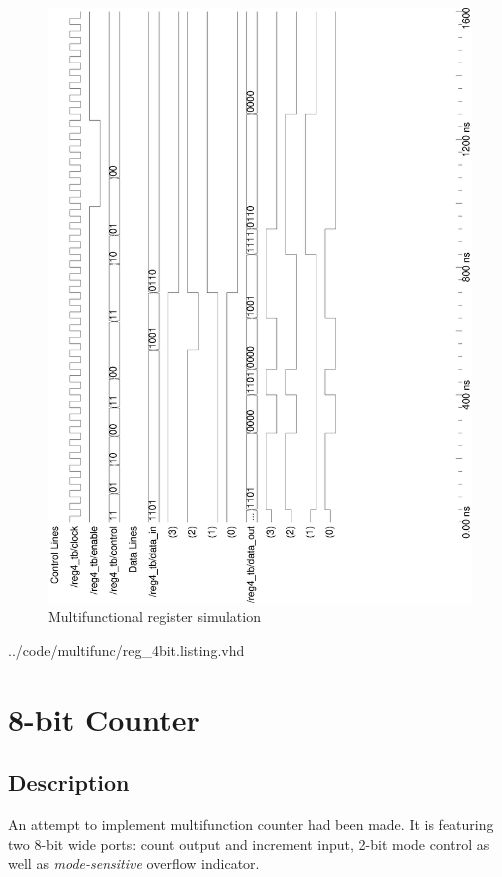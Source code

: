 \documentclass[10pt,a4paper]{report}
\begin{document}
\begin{figure}
\center
\includegraphics[scale=0.4,angle=-90]{graphs/reg_4bit_test.ps}
\caption{\small{Multifunctional register simulation}} \label{wave:reg4}
\end{figure}

\pagebreak

{../code/multifunc/reg_4bit.listing.vhd}

\pagebreak
\section{8-bit Counter}
\subsection{Description}
 
 An attempt to implement multifunction counter had
 been made. It is featuring two 8-bit wide ports:
 count output and increment input, 2-bit mode control
 as well as \emph{mode-sensitive} overflow indicator.
\end{document}

